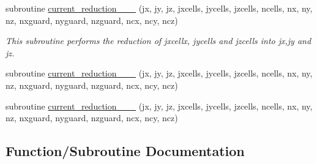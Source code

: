 \begin{DoxyCompactItemize}
subroutine \hyperlink{current__deposition_8_f90_a7fc8e2e07f2c45b26fa3388a9e519c4e}{current\+\_\+reduction\+\_\+\_\+\_} (jx, jy, jz, jxcells, jycells, jzcells, ncells, nx, ny, nz, nxguard, nyguard, nzguard, ncx, ncy, ncz)
\begin{DoxyCompactList}\small\item\em This subroutine performs the reduction of jxcellx, jycells and jzcells into jx,jy and jz. \end{DoxyCompactList}\item 
subroutine \hyperlink{current__deposition_8_f90_a4a6549c8cf282fb4e1818da1e6696fe1}{current\+\_\+reduction\+\_\+\_\+\_} (jx, jy, jz, jxcells, jycells, jzcells, ncells, nx, ny, nz, nxguard, nyguard, nzguard, ncx, ncy, ncz)
\item 
subroutine \hyperlink{current__deposition_8_f90_a1c3d937e970b554b85e71cb31e708636}{current\+\_\+reduction\+\_\+\_\+\_} (jx, jy, jz, jxcells, jycells, jzcells, ncells,                                                                                                                                   nx, ny, nz, nxguard, nyguard, nzguard, ncx, ncy, ncz)
\end{DoxyCompactItemize}


\subsection{Function/\+Subroutine Documentation}
